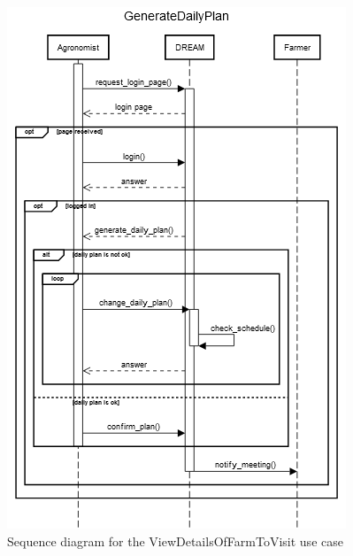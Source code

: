 \documentclass{article}
\begin{document}
\begin{figure}[H]
    \centering
    \includegraphics[scale=0.75]{sequence_diagrams/GenerateDailyPlan}
    \caption{Sequence diagram for the ViewDetailsOfFarmToVisit use case}
\end{figure}

\end{document}
